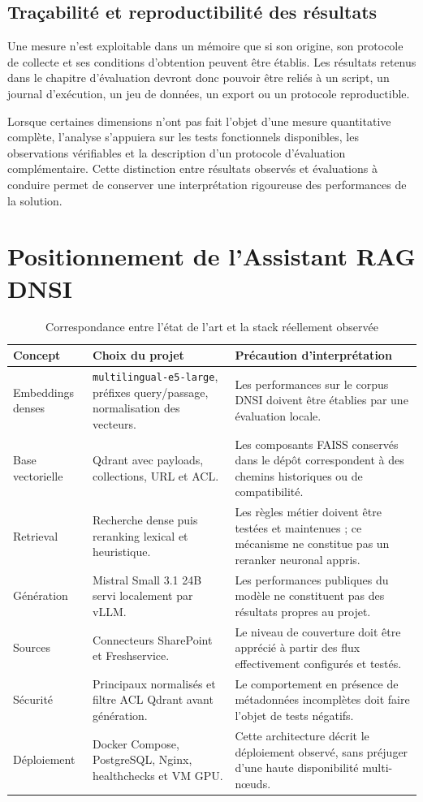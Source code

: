 \subsection{Traçabilité et reproductibilité des résultats}

Une mesure n'est exploitable dans un mémoire que si son origine, son protocole de collecte et ses conditions d'obtention peuvent être établis. Les résultats retenus dans le chapitre d'évaluation devront donc pouvoir être reliés à un script, un journal d'exécution, un jeu de données, un export ou un protocole reproductible.

Lorsque certaines dimensions n'ont pas fait l'objet d'une mesure quantitative complète, l'analyse s'appuiera sur les tests fonctionnels disponibles, les observations vérifiables et la description d'un protocole d'évaluation complémentaire. Cette distinction entre résultats observés et évaluations à conduire permet de conserver une interprétation rigoureuse des performances de la solution.

\section{Positionnement de l'Assistant RAG DNSI}

\begin{table}[H]
\centering
\caption{Correspondance entre l'état de l'art et la stack réellement observée}
\label{tab:positionnement_stack}
\begin{tabular}{p{3.5cm}p{5.2cm}p{5.2cm}}
\toprule
\textbf{Concept} & \textbf{Choix du projet} & \textbf{Précaution d'interprétation} \\
\midrule
Embeddings denses & \texttt{multilingual-e5-large}, préfixes query/passage, normalisation des vecteurs. & Les performances sur le corpus DNSI doivent être établies par une évaluation locale. \\
Base vectorielle & Qdrant avec payloads, collections, URL et ACL. & Les composants FAISS conservés dans le dépôt correspondent à des chemins historiques ou de compatibilité. \\
Retrieval & Recherche dense puis reranking lexical et heuristique. & Les règles métier doivent être testées et maintenues ; ce mécanisme ne constitue pas un reranker neuronal appris. \\
Génération & Mistral Small 3.1 24B servi localement par vLLM. & Les performances publiques du modèle ne constituent pas des résultats propres au projet. \\
Sources & Connecteurs SharePoint et Freshservice. & Le niveau de couverture doit être apprécié à partir des flux effectivement configurés et testés. \\
Sécurité & Principaux normalisés et filtre ACL Qdrant avant génération. & Le comportement en présence de métadonnées incomplètes doit faire l'objet de tests négatifs. \\
Déploiement & Docker Compose, PostgreSQL, Nginx, healthchecks et VM GPU. & Cette architecture décrit le déploiement observé, sans préjuger d'une haute disponibilité multi-nœuds. \\
\bottomrule
\end{tabular}
\end{table}

